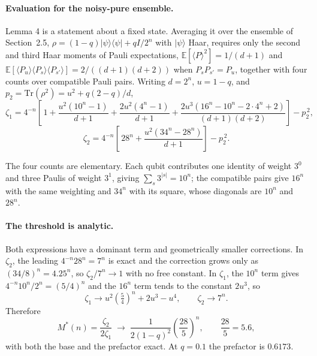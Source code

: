 \paragraph{Evaluation for the noisy-pure ensemble.}
Lemma 4 is a statement about a fixed state. Averaging it over the
ensemble of Section~2.5, \(\rho = (1-q)|\psi\rangle\langle\psi| + q I/2^n\)
with \(|\psi\rangle\) Haar, requires only the second and third Haar
moments of Pauli expectations, \(\mathbb{E}[\langle P\rangle^2] = 1/(d+1)\)
and \(\mathbb{E}[\langle P_u\rangle\langle P_s\rangle\langle P_{s'}\rangle]
= 2/((d+1)(d+2))\) when \(P_sP_{s'} = P_u\), together with four counts
over compatible Pauli pairs. Writing \(d = 2^n\), \(u = 1-q\), and
\(p_2 = \mathrm{Tr}(\rho^2) = u^2 + q(2-q)/d\),
\[
\zeta_1 = 4^{-n}\!\left[\,1
+ \frac{u^2(10^n-1)}{d+1}
+ \frac{2u^2(4^n-1)}{d+1}
+ \frac{2u^3\!\left(16^n - 10^n - 2\cdot 4^n + 2\right)}{(d+1)(d+2)}
\right] - p_2^{\,2},
\]
\[
\zeta_2 = 4^{-n}\!\left[\,28^n + \frac{u^2\!\left(34^n - 28^n\right)}{d+1}\right] - p_2^{\,2}.
\]

The four counts are elementary. Each qubit contributes one identity of
weight \(3^0\) and three Paulis of weight \(3^1\), giving
\(\sum_s 3^{|s|} = 10^n\); the compatible pairs give \(16^n\) with the
same weighting and \(34^n\) with its square, whose diagonals are \(10^n\)
and \(28^n\).

\paragraph{The threshold is analytic.}
Both expressions have a dominant term and geometrically smaller
corrections. In \(\zeta_2\), the leading \(4^{-n}28^n = 7^n\) is exact and
the correction grows only as \((34/8)^n = 4.25^n\), so \(\zeta_2/7^n \to 1\)
with no free constant. In \(\zeta_1\), the \(10^n\) term gives
\(4^{-n}10^n/2^n = (5/4)^n\) and the \(16^n\) term tends to the constant
\(2u^3\), so
\[
\zeta_1 \longrightarrow u^2\left(\tfrac{5}{4}\right)^{\! n} + 2u^3 - u^4,
\qquad
\zeta_2 \longrightarrow 7^n .
\]
Therefore
\[
M^*(n) = \frac{\zeta_2}{2\zeta_1}
\;\longrightarrow\;
\frac{1}{2(1-q)^2}\left(\frac{28}{5}\right)^{\! n},
\qquad \frac{28}{5} = 5.6,
\]
with both the base and the prefactor exact. At \(q = 0.1\) the prefactor
is \(0.6173\).

